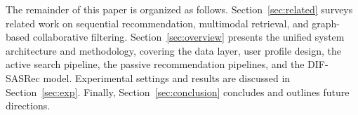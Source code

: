 The remainder of this paper is organized as follows.
Section~\ref{sec:related} surveys related work on sequential
recommendation, multimodal retrieval, and graph-based collaborative
filtering.
Section~\ref{sec:overview} presents the unified system architecture and methodology, covering the data layer, user profile design, the active search pipeline, the passive recommendation pipelines, and the DIF-SASRec model. Experimental settings and results are discussed in
Section~\ref{sec:exp}. Finally, Section~\ref{sec:conclusion} concludes and outlines future directions.
